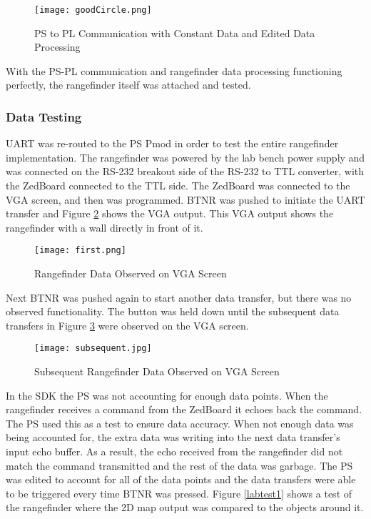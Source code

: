 \begin{figure}[H]
	\centerline{\texttt{[image: goodCircle.png]}}
	\caption{PS to PL Communication with Constant Data and Edited Data Processing}
	\label{goodCircle}
\end{figure}

With the PS-PL communication and rangefinder data processing functioning perfectly, the rangefinder itself was attached and tested.

\subsubsection{Data Testing}
UART was re-routed to the PS Pmod in order to test the entire rangefinder implementation. The rangefinder was powered by the lab bench power supply and was connected on the RS-232 breakout side of the RS-232 to TTL converter, with the ZedBoard connected to the TTL side. The ZedBoard was connected to the VGA screen, and then was programmed. BTNR was pushed to initiate the UART transfer and Figure \ref{first} shows the VGA output. This VGA output shows the rangefinder with a wall directly in front of it.

\begin{figure}[H]
	\centerline{\texttt{[image: first.png]}}
	\caption{Rangefinder Data Observed on VGA Screen}
	\label{first}
\end{figure}

Next BTNR was pushed again to start another data transfer, but there was no observed functionality. The button was held down until the subsequent data transfers in Figure \ref{subsequent} were observed on the VGA screen.

\begin{figure}[H]
	\centerline{\texttt{[image: subsequent.jpg]}}
	\caption{Subsequent Rangefinder Data Observed on VGA Screen}
	\label{subsequent}
\end{figure}

In the SDK the PS was not accounting for enough data points. When the rangefinder receives a command from the ZedBoard it echoes back the command. The PS used this as a test to ensure data accuracy. When not enough data was being accounted for, the extra data was writing into the next data transfer's input echo buffer. As a result, the echo received from the rangefinder did not match the command transmitted and the rest of the data was garbage. The PS was edited to account for all of the data points and the data transfers were able to be triggered every time BTNR was pressed. Figure \ref{labtest1} shows a test of the rangefinder where the 2D map output was compared to the objects around it.

